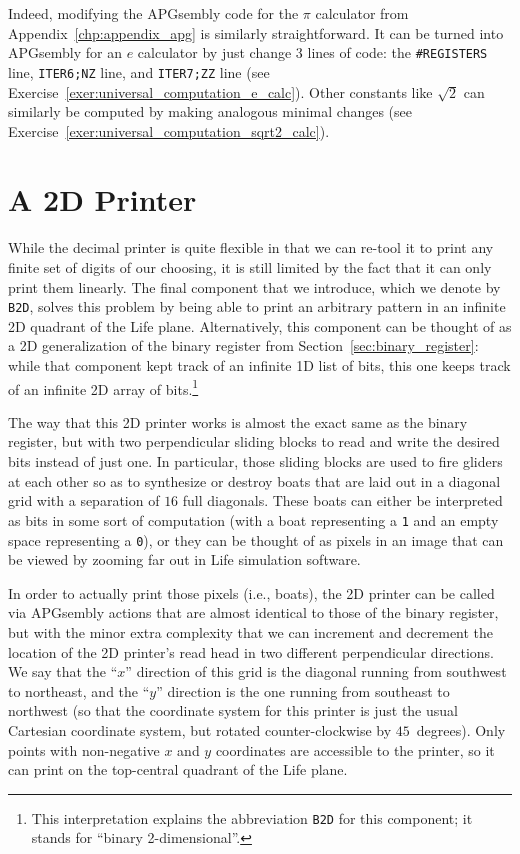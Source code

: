 Indeed, modifying the APGsembly code for the $\pi$ calculator from Appendix~\ref{chp:appendix_apg} is similarly straightforward. It can be turned into APGsembly for an $e$ calculator by just change $3$ lines of code: the \texttt{\#REGISTERS} line, \texttt{ITER6;NZ} line, and \texttt{ITER7;ZZ} line (see Exercise~\ref{exer:universal_computation_e_calc}). Other constants like $\sqrt{2}$ can similarly be computed by making analogous minimal changes (see Exercise~\ref{exer:universal_computation_sqrt2_calc}).



\section{A 2D Printer}\label{sec:2dprinter}

While the decimal printer is quite flexible in that we can re-tool it to print any finite set of digits of our choosing, it is still limited by the fact that it can only print them linearly. The final component that we introduce, which we denote by \texttt{B2D}, solves this problem by being able to print an arbitrary pattern in an infinite 2D quadrant of the Life plane. Alternatively, this component can be thought of as a 2D generalization of the binary register from Section~\ref{sec:binary_register}: while that component kept track of an infinite 1D list of bits, this one keeps track of an infinite 2D array of bits.\footnote{This interpretation explains the abbreviation \texttt{B2D} for this component; it stands for ``binary 2-dimensional''.}

The way that this 2D printer works is almost the exact same as the binary register, but with two perpendicular sliding blocks to read and write the desired bits instead of just one. In particular, those sliding blocks are used to fire gliders at each other so as to synthesize or destroy boats that are laid out in a diagonal grid with a separation of $16$ full diagonals. These boats can either be interpreted as bits in some sort of computation (with a boat representing a \texttt{1} and an empty space representing a \texttt{0}), or they can be thought of as pixels in an image that can be viewed by zooming far out in Life simulation software.

In order to actually print those pixels (i.e., boats), the 2D printer can be called via APGsembly actions that are almost identical to those of the binary register, but with the minor extra complexity that we can increment and decrement the location of the 2D printer's read head  in two different perpendicular directions. We say that the ``$x$'' direction of this grid is the diagonal running from southwest to northeast, and the ``$y$'' direction is the one running from southeast to northwest (so that the coordinate system for this printer is just the usual Cartesian coordinate system, but rotated counter-clockwise by $45$~degrees). Only points with non-negative $x$ and $y$ coordinates are accessible to the printer, so it can print on the top-central quadrant of the Life plane.

